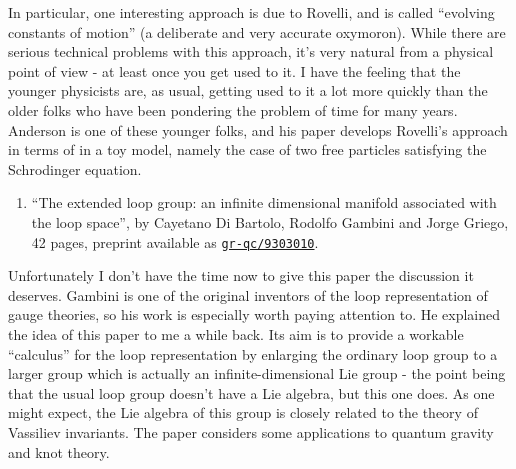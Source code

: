 \documentclass{article}
\def\tightlist{}
\begin{document}
In particular, one interesting approach is due to Rovelli, and is called
``evolving constants of motion'' (a deliberate and very accurate
oxymoron). While there are serious technical problems with this
approach, it's very natural from a physical point of view - at least
once you get used to it. I have the feeling that the younger physicists
are, as usual, getting used to it a lot more quickly than the older
folks who have been pondering the problem of time for many years.
Anderson is one of these younger folks, and his paper develops Rovelli's
approach in terms of in a toy model, namely the case of two free
particles satisfying the Schrodinger equation.

\begin{enumerate}
\def\labelenumi{\arabic{enumi})}
\setcounter{enumi}{5}
\tightlist
\item
  ``The extended loop group: an infinite dimensional manifold associated
  with the loop space'', by Cayetano Di Bartolo, Rodolfo Gambini and
  Jorge Griego, 42 pages, preprint available as
  \href{http://xxx.lanl.gov/abs/gr-qc/9303010}{\texttt{gr-qc/9303010}}.
\end{enumerate}

Unfortunately I don't have the time now to give this paper the
discussion it deserves. Gambini is one of the original inventors of the
loop representation of gauge theories, so his work is especially worth
paying attention to. He explained the idea of this paper to me a while
back. Its aim is to provide a workable ``calculus'' for the loop
representation by enlarging the ordinary loop group to a larger group
which is actually an infinite-dimensional Lie group - the point being
that the usual loop group doesn't have a Lie algebra, but this one does.
As one might expect, the Lie algebra of this group is closely related to
the theory of Vassiliev invariants. The paper considers some
applications to quantum gravity and knot theory.
\end{document}
